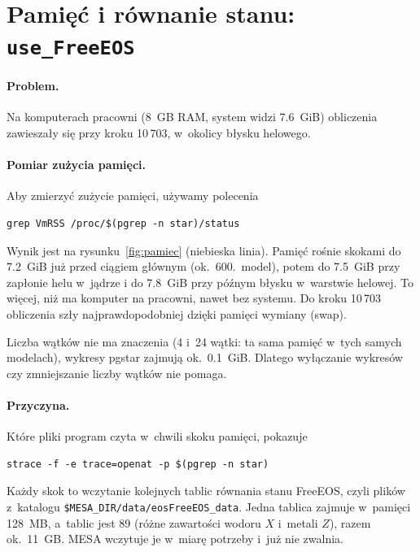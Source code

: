 \documentclass[11pt,a4paper]{article}
\begin{document}
\section{Pamięć i równanie stanu: \texttt{use\_FreeEOS}}\label{sec:pamiec}

\paragraph{Problem.} Na komputerach pracowni (8~GB RAM, system widzi 7.6~GiB) obliczenia
zawieszały się przy kroku 10\,703, w~okolicy błysku helowego.

\paragraph{Pomiar zużycia pamięci.} Aby zmierzyć zużycie pamięci, używamy polecenia
\begin{verbatim}
grep VmRSS /proc/$(pgrep -n star)/status
\end{verbatim}
Wynik jest na rysunku~\ref{fig:pamiec} (niebieska linia). Pamięć rośnie skokami do 7.2~GiB już
przed ciągiem głównym (ok.~600.~model), potem do 7.5~GiB przy zapłonie helu w~jądrze i do 7.8~GiB
przy późnym błysku w~warstwie helowej. To więcej, niż ma komputer na pracowni, nawet bez systemu.
Do kroku 10\,703 obliczenia szły najprawdopodobniej dzięki pamięci wymiany (swap).

Liczba wątków nie ma znaczenia (4 i~24 wątki: ta sama pamięć w~tych samych modelach), wykresy
pgstar zajmują ok.~0.1~GiB. Dlatego wyłączanie wykresów czy zmniejszanie liczby wątków nie pomaga.

\paragraph{Przyczyna.} Które pliki program czyta w~chwili skoku pamięci, pokazuje
\begin{verbatim}
strace -f -e trace=openat -p $(pgrep -n star)
\end{verbatim}
Każdy skok to wczytanie kolejnych tablic równania stanu FreeEOS, czyli plików z~katalogu
\verb!$MESA_DIR/data/eosFreeEOS_data!. Jedna tablica zajmuje w~pamięci 128~MB, a~tablic jest
89 (różne zawartości wodoru $X$ i~metali $Z$), razem ok.~11~GB. MESA wczytuje je w~miarę
potrzeby i~już nie zwalnia.
\end{document}
